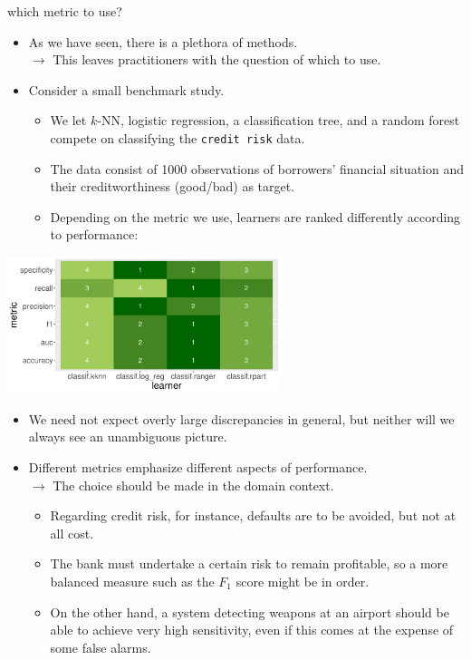\documentclass[11pt,compress,t,notes=noshow, xcolor=table]{beamer}
\begin{document}

\begin{vbframe}{which metric to use?}

\begin{itemize}
  \small
  \item As we have seen, there is a plethora of methods. \\
  $\rightarrow$ This leaves practitioners with the question of which to use.
  \item Consider a small benchmark study.
  \begin{itemize}
    \small
    \item We let $k$-NN, logistic regression, a classification tree, and a random 
    forest compete on classifying the \texttt{credit risk} data.
    \item The data consist of 1000 observations of borrowers' financial situation 
    and their creditworthiness (good/bad) as target.
    \item Depending on the metric we use, learners are ranked differently 
    according to performance:
  \end{itemize}
\end{itemize}

\begin{center}
\includegraphics[width=0.6\textwidth]{figure/eval_mclass_benchmark.pdf}
\end{center}

\framebreak

\begin{itemize}
  \item We need not expect overly large discrepancies in general, but neither 
  will we always see an unambiguous picture. 
  \item Different metrics emphasize different aspects of performance. \\
  $\rightarrow$ The choice should be made in the domain context.
  \begin{itemize}
    \item Regarding credit risk, for instance, defaults are to be avoided, but 
    not at all cost.
    \item The bank must undertake a certain risk to remain profitable, so a more 
    balanced measure such as the $F_1$ score might be in order.
    \item On the other hand, a system detecting weapons at an airport should be 
    able to achieve very high sensitivity, even if this comes at the expense of 
    some false alarms.
  \end{itemize}
\end{itemize}


\end{vbframe}
\end{document}
